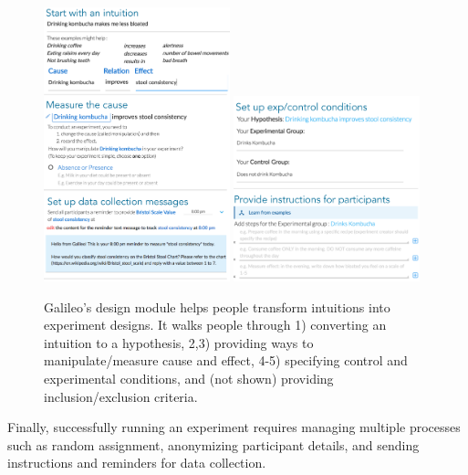 \begin{figure}
  \centering
  \includegraphics[width=0.48\textwidth]{figures/galileo/galileo-2-design}
  \includegraphics[width=0.48\textwidth]{figures/galileo/galileo-2-design-2}
  \caption[Galileo's design module helps people transform intuitions into experiment designs]
{Galileo's  design module helps people transform intuitions into experiment designs. It walks people through 1) converting an intuition to a hypothesis, 2,3) providing ways to manipulate/measure cause and effect, 4-5) specifying control and experimental conditions, and (not shown) providing inclusion/exclusion criteria.}
  \label{fig:galileo-2}
\end{figure}

Finally, successfully running an experiment requires managing multiple processes such as random assignment, anonymizing participant details, and sending instructions and reminders for data collection.

